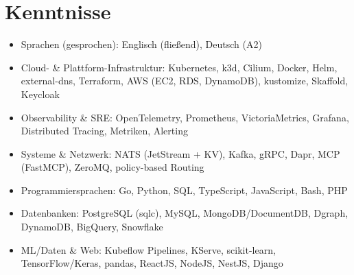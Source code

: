 \documentclass[10pt,a4paper]{resume}
\begin{document}
\section{Kenntnisse}

\begin{itemize}[leftmargin=1.4em,nosep,topsep=2pt]
  \item Sprachen (gesprochen): Englisch (fließend), Deutsch (A2)
  \item Cloud- \& Plattform-Infrastruktur: Kubernetes, k3d, Cilium, Docker, Helm, external-dns, Terraform, AWS (EC2, RDS, DynamoDB), kustomize, Skaffold, Keycloak
  \item Observability \& SRE: OpenTelemetry, Prometheus, VictoriaMetrics, Grafana, Distributed Tracing, Metriken, Alerting
  \item Systeme \& Netzwerk: NATS (JetStream + KV), Kafka, gRPC, Dapr, MCP (FastMCP), ZeroMQ, policy-based Routing
  \item Programmiersprachen: Go, Python, SQL, TypeScript, JavaScript, Bash, PHP
  \item Datenbanken: PostgreSQL (sqlc), MySQL, MongoDB/DocumentDB, Dgraph, DynamoDB, BigQuery, Snowflake
  \item ML/Daten \& Web: Kubeflow Pipelines, KServe, scikit-learn, TensorFlow/Keras, pandas, ReactJS, NodeJS, NestJS, Django
\end{itemize}
\end{document}
